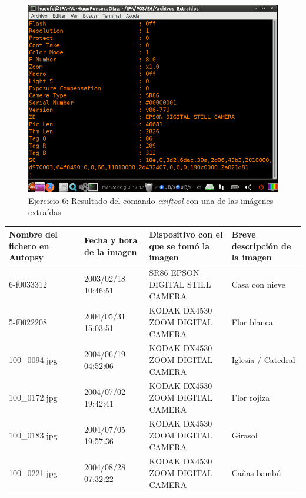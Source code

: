 \documentclass[11pt]{article}
\begin{document}
\begin{figure}[H]
    \caption{Ejercicio 6: Resultado del comando \textit{exiftool} con una de las imágenes extraídas}
    \centering
    \includegraphics[scale=0.7]{e6-7.png}
\end{figure}

\begin{table}[H]
    \centering
    \begin{tabular}{|p{3cm}|p{2cm}|p{8cm}|p{3cm}|}
        \hline
        Nombre del fichero en Autopsy & Fecha y hora de la imagen & Dispositivo con el que se tomó la imagen & Breve descripción de la imagen \\
        \hline\hline
        6-f0033312 & 2003/02/18 10:46:51 & SR86 EPSON DIGITAL STILL CAMERA & Casa con nieve \\
        \hline
        5-f0022208 & 2004/05/31 15:03:51 & KODAK DX4530 ZOOM DIGITAL CAMERA & Flor blanca \\
        \hline
        100\_0094.jpg & 2004/06/19 04:52:06 & KODAK DX4530 ZOOM DIGITAL CAMERA & Iglesia / Catedral \\
        \hline
        100\_0172.jpg & 2004/07/02 19:42:41 & KODAK DX4530 ZOOM DIGITAL CAMERA & Flor rojiza \\
        \hline
        100\_0183.jpg & 2004/07/05 19:57:36 & KODAK DX4530 ZOOM DIGITAL CAMERA & Girasol \\
        \hline
        100\_0221.jpg & 2004/08/28 07:32:22 & KODAK DX4530 ZOOM DIGITAL CAMERA & Cañas bambú \\
        \hline
    \end{tabular}
\end{table}
\end{document}
